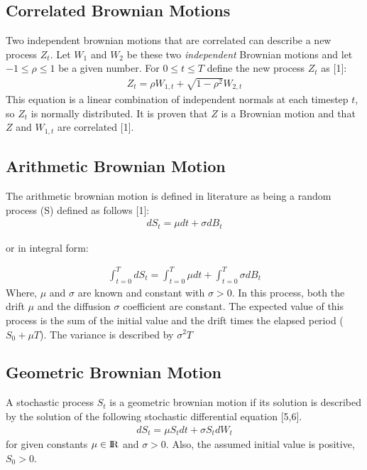 \documentclass[12pt,twoside]{reedthesis}
\theoremstyle{definition}
\theoremstyle{definition}
\theoremstyle{remark}
\begin{document}
  \subsection{Correlated Brownian Motions}\label{corr}
  
  Two independent brownian motions that are correlated can describe a new
  process \(Z_t\). Let \(W_1\) and \(W_2\) be these two \emph{independent}
  Brownian motions and let \(-1 \leq \rho \leq 1\) be a given number. For
  \(0 \leq t \leq T\) define the new process \(Z_t\) as {[}1{]}:
  \begin{align}
  \label{eq:corr_brow}
  Z_t = \rho W_{1,t} + \sqrt{1-\rho^2}W_{2,t}
  \end{align}
  \noindent
  This equation is a linear combination of independent normals at each
  timestep \(t\), so \(Z_t\) is normally distributed. It is proven that
  \(Z\) is a Brownian motion and that \(Z\) and \(W_{1,t}\) are correlated
  {[}1{]}.
  
  \subsection{Arithmetic Brownian
  Motion}\label{arithmetic-brownian-motion}
  
  The arithmetic brownian motion is defined in literature as being a
  random process (S) defined as follows {[}1{]}:
  \begin{align}
  dS_t = \mu dt + \sigma dB_t
  \end{align}
  \begin{center}or in integral form:\end{center}
  \begin{align}
  \int_{t=0}^{T} dS_t = \int_{t=0}^{T}{\mu dt} + \int_{t=0}^{T}{\sigma dB_t}
  \end{align}
  \noindent
  Where, \(\mu\) and \(\sigma\) are known and constant with
  \(\sigma > 0\). In this process, both the drift \(\mu\) and the
  diffusion \(\sigma\) coefficient are constant. The expected value of
  this process is the sum of the initial value and the drift times the
  elapsed period (\(S_0 + \mu T\)). The variance is described by
  \(\sigma^2 T\)
  
  \subsection{Geometric Brownian Motion}\label{geometric-brownian-motion}
  
  A stochastic process \(S_t\) is a geometric brownian motion if its
  solution is described by the solution of the following stochastic
  differential equation {[}5,6{]}.
  \begin{align}
  dS_t = \mu S_t dt + \sigma S_t dW_t
  \end{align}
  \noindent
  for given constants \(\mu \in {\rm I\!R}\) and \(\sigma > 0\). Also, the
  assumed initial value is positive, \(S_0 >0\).
  
\end{document}
